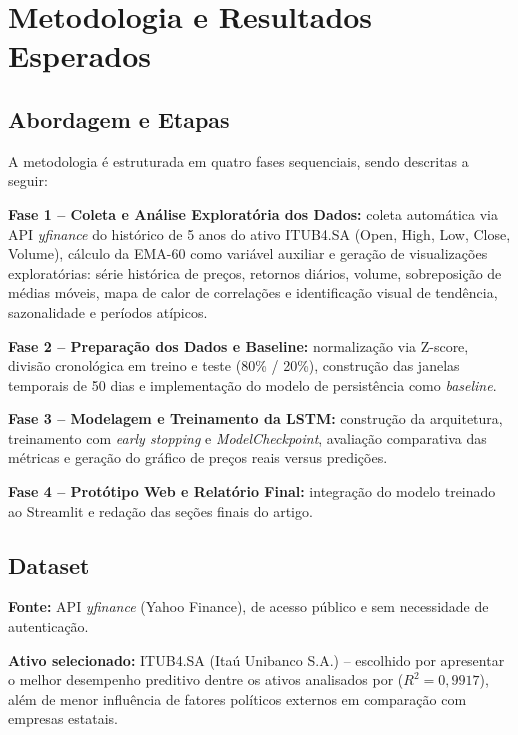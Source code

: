 \documentclass[12pt]{article}
\begin{document}
\section{Metodologia e Resultados Esperados}

\subsection{Abordagem e Etapas}

A metodologia é estruturada em quatro fases sequenciais, sendo descritas a seguir:

\textbf{Fase 1 -- Coleta e Análise Exploratória dos Dados:}
coleta automática via API \textit{yfinance} do histórico de 5 anos do ativo
ITUB4.SA (Open, High, Low, Close, Volume), cálculo da EMA-60 como variável
auxiliar e geração de visualizações exploratórias: série histórica de preços,
retornos diários, volume, sobreposição de médias móveis, mapa de calor de
correlações e identificação visual de tendência, sazonalidade e períodos
atípicos.

\textbf{Fase 2 -- Preparação dos Dados e Baseline:}
normalização via Z-score, divisão cronológica em treino e teste
(80\% / 20\%), construção das janelas temporais de 50 dias e
implementação do modelo de persistência como \textit{baseline}.

\textbf{Fase 3 -- Modelagem e Treinamento da LSTM:}
construção da arquitetura, treinamento com \textit{early stopping} e
\textit{ModelCheckpoint}, avaliação comparativa das métricas e geração do
gráfico de preços reais versus predições.

\textbf{Fase 4 -- Protótipo Web e Relatório Final:}
integração do modelo treinado ao Streamlit e redação das seções finais do
artigo.

\subsection{Dataset}

\textbf{Fonte:} API \textit{yfinance} (Yahoo Finance), de acesso público e
sem necessidade de autenticação.

\textbf{Ativo selecionado:} ITUB4.SA (Itaú Unibanco S.A.) -- escolhido por
apresentar o melhor desempenho preditivo dentre os ativos analisados por
\cite{zanotto:2026} ($R^2 = 0{,}9917$), além de menor influência de fatores
políticos externos em comparação com empresas estatais.
\end{document}
